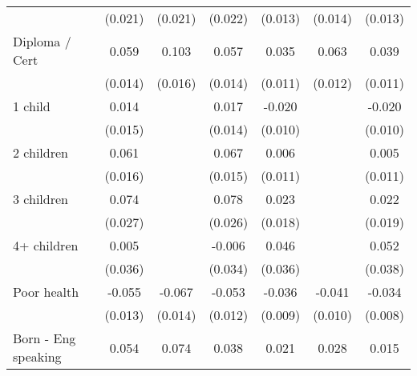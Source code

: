 {\begin{tabular}{l*{6}{c}}
                    &     (0.021)         &     (0.021)         &     (0.022)         &     (0.013)         &     (0.014)         &     (0.013)         \\
Diploma / Cert      &       0.059\sym{***}&       0.103\sym{***}&       0.057\sym{***}&       0.035\sym{***}&       0.063\sym{***}&       0.039\sym{***}\\
                    &     (0.014)         &     (0.016)         &     (0.014)         &     (0.011)         &     (0.012)         &     (0.011)         \\
1 child             &       0.014         &                     &       0.017         &      -0.020\sym{**} &                     &      -0.020\sym{**} \\
                    &     (0.015)         &                     &     (0.014)         &     (0.010)         &                     &     (0.010)         \\
2 children          &       0.061\sym{***}&                     &       0.067\sym{***}&       0.006         &                     &       0.005         \\
                    &     (0.016)         &                     &     (0.015)         &     (0.011)         &                     &     (0.011)         \\
3 children          &       0.074\sym{***}&                     &       0.078\sym{***}&       0.023         &                     &       0.022         \\
                    &     (0.027)         &                     &     (0.026)         &     (0.018)         &                     &     (0.019)         \\
4+ children         &       0.005         &                     &      -0.006         &       0.046         &                     &       0.052         \\
                    &     (0.036)         &                     &     (0.034)         &     (0.036)         &                     &     (0.038)         \\
Poor health         &      -0.055\sym{***}&      -0.067\sym{***}&      -0.053\sym{***}&      -0.036\sym{***}&      -0.041\sym{***}&      -0.034\sym{***}\\
                    &     (0.013)         &     (0.014)         &     (0.012)         &     (0.009)         &     (0.010)         &     (0.008)         \\
Born - Eng speaking &       0.054\sym{***}&       0.074\sym{***}&       0.038\sym{*}  &       0.021         &       0.028\sym{*}  &       0.015         \\

\end{tabular}}
